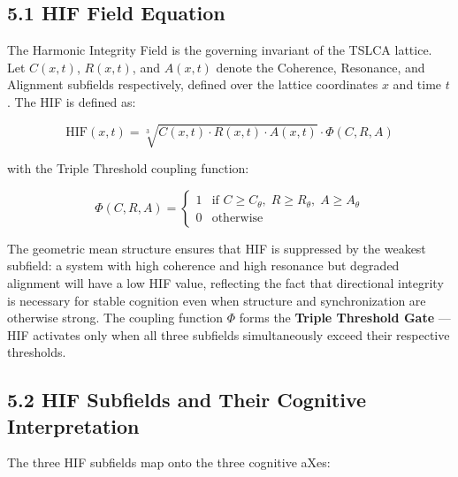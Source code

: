 \subsection{5.1 HIF Field Equation}\label{hif-field-equation}

The Harmonic Integrity Field is the governing invariant of the TSLCA lattice. Let \(C(x,t)\), \(R(x,t)\), and \(A(x,t)\) denote the Coherence, Resonance, and Alignment subfields respectively, defined over the lattice coordinates \(x\) and time \(t\). The HIF is defined as:

\[
\mathrm{HIF}(x,t) = \sqrt[3]{C(x,t) \cdot R(x,t) \cdot A(x,t)} \cdot \Phi(C,R,A)
\]

with the Triple Threshold coupling function:

\[
\Phi(C,R,A) =
\begin{cases}
1 & \text{if } C \ge C_{\theta},\; R \ge R_{\theta},\; A \ge A_{\theta} \\
0 & \text{otherwise}
\end{cases}
\]

The geometric mean structure ensures that HIF is suppressed by the weakest subfield: a system with high coherence and high resonance but degraded alignment will have a low HIF value, reflecting the fact that directional integrity is necessary for stable cognition even when structure and synchronization are otherwise strong. The coupling function \(\Phi\) forms the \textbf{Triple Threshold Gate} --- HIF activates only when all three subfields simultaneously exceed their respective thresholds.

\subsection{5.2 HIF Subfields and Their Cognitive Interpretation}\label{hif-subfields-and-their-cognitive-interpretation}

The three HIF subfields map onto the three cognitive aXes:

